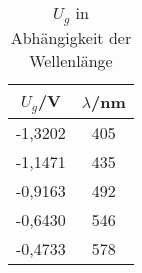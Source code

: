 \begin{table}[h]
	\begin{center}
		\begin{tabular}{cc}
			$U_g$/V&$\lambda$/nm \\ \hline
			-1,3202&405\\
			-1,1471&435\\
			-0,9163&492\\
			-0,6430&546\\
			-0,4733&578
		\end{tabular}
		\caption{$U_g$ in Abhängigkeit der Wellenlänge}
		\label{tabug}
	\end{center}
\end{table}